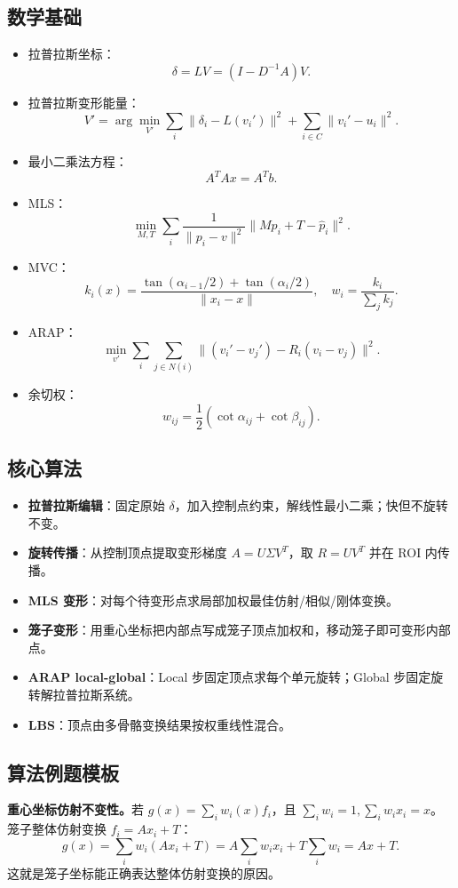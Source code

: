 \documentclass[UTF8,zihao=-4,scheme=chinese,fontset=fandol]{ctexart}
\newcommand{\key}[1]{\textbf{#1}}
\begin{document}
\subsection{数学基础}
\begin{itemize}
  \item 拉普拉斯坐标：
  \[
  \delta=LV=(I-D^{-1}A)V.
  \]
  \item 拉普拉斯变形能量：
  \[
  V'=\arg\min_{V'}\sum_i\|\delta_i-L(v_i')\|^2+\sum_{i\in C}\|v_i'-u_i\|^2.
  \]
  \item 最小二乘法方程：
  \[
  A^TAx=A^Tb.
  \]
  \item MLS：
  \[
  \min_{M,T}\sum_i\frac1{\|p_i-v\|^2}\|Mp_i+T-\hat p_i\|^2.
  \]
  \item MVC：
  \[
  k_i(x)=\frac{\tan(\alpha_{i-1}/2)+\tan(\alpha_i/2)}{\|x_i-x\|},\quad
  w_i=\frac{k_i}{\sum_jk_j}.
  \]
  \item ARAP：
  \[
  \min_{v'}\sum_i\sum_{j\in N(i)}\|(v_i'-v_j')-R_i(v_i-v_j)\|^2.
  \]
  \item 余切权：
  \[
  w_{ij}=\frac12(\cot\alpha_{ij}+\cot\beta_{ij}).
  \]
\end{itemize}

\subsection{核心算法}
\begin{itemize}
  \item \key{拉普拉斯编辑}：固定原始 $\delta$，加入控制点约束，解线性最小二乘；快但不旋转不变。
  \item \key{旋转传播}：从控制顶点提取变形梯度 $A=U\Sigma V^T$，取 $R=UV^T$ 并在 ROI 内传播。
  \item \key{MLS 变形}：对每个待变形点求局部加权最佳仿射/相似/刚体变换。
  \item \key{笼子变形}：用重心坐标把内部点写成笼子顶点加权和，移动笼子即可变形内部点。
  \item \key{ARAP local-global}：Local 步固定顶点求每个单元旋转；Global 步固定旋转解拉普拉斯系统。
  \item \key{LBS}：顶点由多骨骼变换结果按权重线性混合。
\end{itemize}

\subsection{算法例题模板}
\textbf{重心坐标仿射不变性。}若 $g(x)=\sum_iw_i(x)f_i$，且 $\sum_iw_i=1,\sum_iw_ix_i=x$。笼子整体仿射变换 $f_i=Ax_i+T$：
\[
g(x)=\sum_iw_i(Ax_i+T)=A\sum_iw_ix_i+T\sum_iw_i=Ax+T.
\]
这就是笼子坐标能正确表达整体仿射变换的原因。
\end{document}
